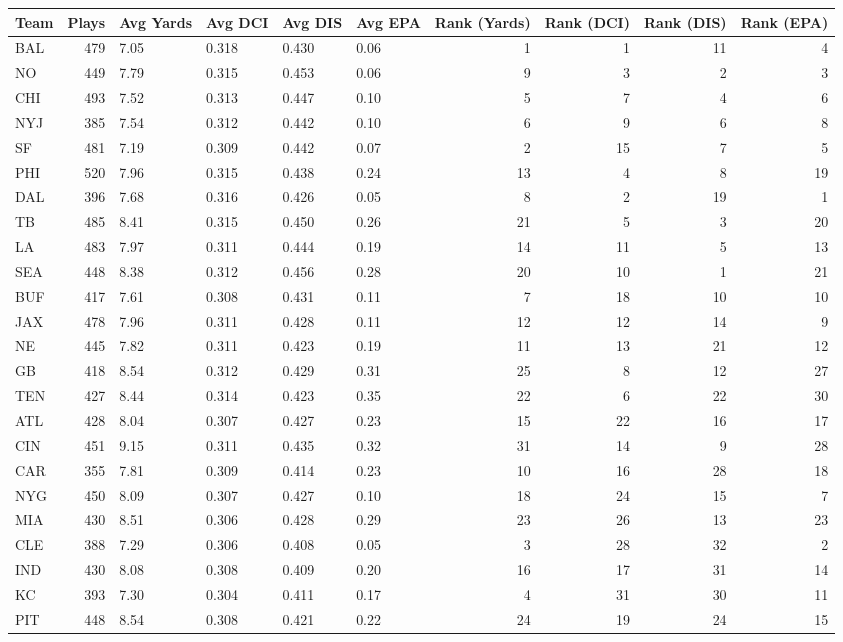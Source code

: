 \begin{tabular}{lrllllrrrr}
\toprule
Team & Plays & Avg Yards & Avg DCI & Avg DIS & Avg EPA & Rank (Yards) & Rank (DCI) & Rank (DIS) & Rank (EPA) \\
\midrule
BAL & 479 & 7.05 & 0.318 & 0.430 & 0.06 & 1 & 1 & 11 & 4 \\
NO & 449 & 7.79 & 0.315 & 0.453 & 0.06 & 9 & 3 & 2 & 3 \\
CHI & 493 & 7.52 & 0.313 & 0.447 & 0.10 & 5 & 7 & 4 & 6 \\
NYJ & 385 & 7.54 & 0.312 & 0.442 & 0.10 & 6 & 9 & 6 & 8 \\
SF & 481 & 7.19 & 0.309 & 0.442 & 0.07 & 2 & 15 & 7 & 5 \\
PHI & 520 & 7.96 & 0.315 & 0.438 & 0.24 & 13 & 4 & 8 & 19 \\
DAL & 396 & 7.68 & 0.316 & 0.426 & 0.05 & 8 & 2 & 19 & 1 \\
TB & 485 & 8.41 & 0.315 & 0.450 & 0.26 & 21 & 5 & 3 & 20 \\
LA & 483 & 7.97 & 0.311 & 0.444 & 0.19 & 14 & 11 & 5 & 13 \\
SEA & 448 & 8.38 & 0.312 & 0.456 & 0.28 & 20 & 10 & 1 & 21 \\
BUF & 417 & 7.61 & 0.308 & 0.431 & 0.11 & 7 & 18 & 10 & 10 \\
JAX & 478 & 7.96 & 0.311 & 0.428 & 0.11 & 12 & 12 & 14 & 9 \\
NE & 445 & 7.82 & 0.311 & 0.423 & 0.19 & 11 & 13 & 21 & 12 \\
GB & 418 & 8.54 & 0.312 & 0.429 & 0.31 & 25 & 8 & 12 & 27 \\
TEN & 427 & 8.44 & 0.314 & 0.423 & 0.35 & 22 & 6 & 22 & 30 \\
ATL & 428 & 8.04 & 0.307 & 0.427 & 0.23 & 15 & 22 & 16 & 17 \\
CIN & 451 & 9.15 & 0.311 & 0.435 & 0.32 & 31 & 14 & 9 & 28 \\
CAR & 355 & 7.81 & 0.309 & 0.414 & 0.23 & 10 & 16 & 28 & 18 \\
NYG & 450 & 8.09 & 0.307 & 0.427 & 0.10 & 18 & 24 & 15 & 7 \\
MIA & 430 & 8.51 & 0.306 & 0.428 & 0.29 & 23 & 26 & 13 & 23 \\
CLE & 388 & 7.29 & 0.306 & 0.408 & 0.05 & 3 & 28 & 32 & 2 \\
IND & 430 & 8.08 & 0.308 & 0.409 & 0.20 & 16 & 17 & 31 & 14 \\
KC & 393 & 7.30 & 0.304 & 0.411 & 0.17 & 4 & 31 & 30 & 11 \\
PIT & 448 & 8.54 & 0.308 & 0.421 & 0.22 & 24 & 19 & 24 & 15 \\

\end{tabular}
